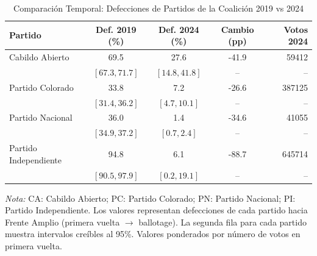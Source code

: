 \begin{table}[htbp]
\centering
\caption{Comparación Temporal: Defecciones de Partidos de la Coalición 2019 vs 2024}
\label{tab:temporal_summary}
\small
\begin{tabular}{lcccr}
\toprule
{\textbf{Partido}} & {\textbf{Def. 2019 (\%)}} & {\textbf{Def. 2024 (\%)}} & {\textbf{Cambio (pp)}} & {\textbf{Votos 2024}} \\
\midrule
Cabildo Abierto & 69.5 & 27.6 & -41.9 & 59412 \\
 & $[67.3, 71.7]$ & $[14.8, 41.8]$ & {--} & {--} \\
Partido Colorado & 33.8 & 7.2 & -26.6 & 387125 \\
 & $[31.4, 36.2]$ & $[4.7, 10.1]$ & {--} & {--} \\
Partido Nacional & 36.0 & 1.4 & -34.6 & 41055 \\
 & $[34.9, 37.2]$ & $[0.7, 2.4]$ & {--} & {--} \\
Partido Independiente & 94.8 & 6.1 & -88.7 & 645714 \\
 & $[90.5, 97.9]$ & $[0.2, 19.1]$ & {--} & {--} \\
\bottomrule
\end{tabular}
\begin{flushleft}
\small \textit{Nota:} CA: Cabildo Abierto; PC: Partido Colorado; PN: Partido Nacional; PI: Partido Independiente. Los valores representan defecciones de cada partido hacia Frente Amplio (primera vuelta $\rightarrow$ ballotage). La segunda fila para cada partido muestra intervalos creíbles al 95\%. Valores ponderados por número de votos en primera vuelta.
\end{flushleft}
\end{table}
